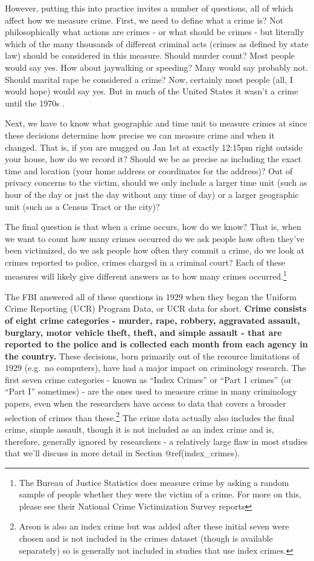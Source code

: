 \documentclass[
  12pt,
  openany]{book}
\begin{document}
However, putting this into practice invites a number of questions, all of which affect how we measure crime. First, we need to define what a crime is? Not philosophically what actions are crimes - or what should be crimes - but literally which of the many thousands of different criminal acts (crimes as defined by state law) should be considered in this measure. Should murder count? Most people would say yes. How about jaywalking or speeding? Many would say probably not. Should marital rape be considered a crime? Now, certainly most people (all, I would hope) would say yes. But in much of the United States it wasn't a crime until the 1970s \citep{bennice2003marital, mcmahon2009criminalizing}.

Next, we have to know what geographic and time unit to measure crimes at since these decisions determine how precise we can measure crime and when it changed. That is, if you are mugged on Jan 1st at exactly 12:15pm right outside your house, how do we record it? Should we be as precise as including the exact time and location (your home address or coordinates for the address)? Out of privacy concerns to the victim, should we only include a larger time unit (such as hour of the day or just the day without any time of day) or a larger geographic unit (such as a Census Tract or the city)?

The final question is that when a crime occurs, how do we know? That is, when we want to count how many crimes occurred do we ask people how often they've been victimized, do we ask people how often they commit a crime, do we look at crimes reported to police, crimes charged in a criminal court? Each of these measures will likely give different answers as to how many crimes occurred.\footnote{The Bureau of Justice Statistics does measure crime by asking a random sample of people whether they were the victim of a crime. For more on this, please see their National Crime Victimization Survey reports}

The FBI answered all of these questions in 1929 when they began the Uniform Crime Reporting (UCR) Program Data, or UCR data for short. \textbf{Crime consists of eight crime categories - murder, rape, robbery, aggravated assault, burglary, motor vehicle theft, theft, and simple assault - that are reported to the police and is collected each month from each agency in the country.} These decisions, born primarily out of the resource limitations of 1929 (e.g.~no computers), have had a major impact on criminology research. The first seven crime categories - known as ``Index Crimes'' or ``Part 1 crimes'' (or ``Part I'' sometimes) - are the ones used to measure crime in many criminology papers, even when the researchers have access to data that covers a broader selection of crimes than these.\footnote{Arson is also an index crime but was added after these initial seven were chosen and is not included in the crimes dataset (though is available separately) so is generally not included in studies that use index crimes.} The crime data actually also includes the final crime, simple assault, though it is not included as an index crime and is, therefore, generally ignored by researchers - a relatively large flaw in most studies that we'll discuss in more detail in Section @ref(index\_crimes).
\end{document}
